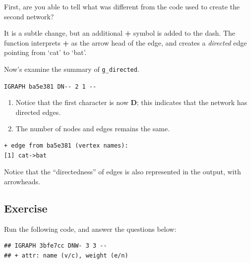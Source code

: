 \documentclass[
]{book}
\newenvironment{Shaded}{\begin{snugshade}}{\end{snugshade}}
\newcommand{\DecValTok}[1]{\textcolor[rgb]{0.00,0.00,0.81}{#1}}
\newcommand{\FunctionTok}[1]{\textcolor[rgb]{0.13,0.29,0.53}{\textbf{#1}}}
\newcommand{\NormalTok}[1]{#1}
\newcommand{\OtherTok}[1]{\textcolor[rgb]{0.56,0.35,0.01}{#1}}
\newcommand{\SpecialCharTok}[1]{\textcolor[rgb]{0.81,0.36,0.00}{\textbf{#1}}}
\providecommand{\tightlist}{%
  \setlength{\itemsep}{0pt}\setlength{\parskip}{0pt}}
\begin{document}
First, are you able to tell what was different from the code used to create the second network?

It is a subtle change, but an additional \textbf{+} symbol is added to the dash. The function interprets \textbf{+} as the arrow head of the edge, and creates a \emph{directed} edge pointing from `cat' to `bat'.

Now's examine the summary of \texttt{g\_directed}.

\texttt{IGRAPH\ ba5e381\ DN-\/-\ 2\ 1\ -\/-}

\begin{enumerate}
\def\labelenumi{\arabic{enumi}.}
\tightlist
\item
  Notice that the first character is now \textbf{D}; this indicates that the network has directed edges.
\item
  The number of nodes and edges remains the same.
\end{enumerate}

\begin{verbatim}
+ edge from ba5e381 (vertex names):
[1] cat->bat
\end{verbatim}

Notice that the ``directedness'' of edges is also represented in the output, with arrowheads.

\subsection{Exercise}\label{exercise-1}

Run the following code, and answer the questions below:

\begin{Shaded}
\end{Shaded}

\begin{verbatim}
## IGRAPH 3bfe7cc DNW- 3 3 -- 
## + attr: name (v/c), weight (e/n)
\end{verbatim}
\end{document}
